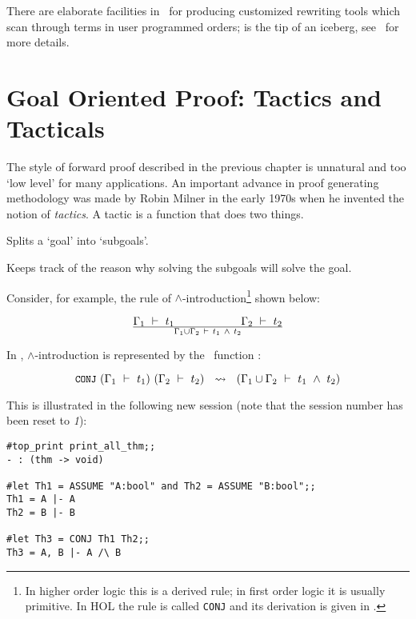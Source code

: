 There are elaborate facilities in \HOL\ for producing customized rewriting tools
which scan through terms in user programmed orders;  is the tip
of an iceberg, see \DESCRIPTION\ for more details.




\chapter{Goal Oriented Proof: Tactics and Tacticals}
\label{backward}\label{tactics}

The style of forward proof described in the previous chapter is unnatural and
too `low level' for many applications. An important advance in proof generating
methodology was made by Robin Milner in the early 1970s when he invented the
notion of {\it tactics\/}. A tactic is a function that does two things.
\begin{myenumerate}
\item Splits a `goal' into `subgoals'.
\item Keeps track of the reason why solving the subgoals will solve the goal.
\end{myenumerate}

\noindent Consider, for example, the  rule of $\wedge$-introduction\footnote{In
higher order logic this is a derived rule; in first  order logic  it is usually
primitive.  In HOL the rule is called {\tt CONJ} and its derivation is given in
\DESCRIPTION.}  shown below:

\[ \Gamma_1\ \vdash\ 
t_1\qquad\qquad\qquad\Gamma_2\ \vdash\  t_2\over \Gamma_1\cup\Gamma_2 \ \vdash\  t_1\ \wedge\ 
t_2 \]


\noindent In \HOL,  $\wedge$-introduction is  represented by  the \ML\ function
:

\[\ml{CONJ}\ (\Gamma_1\turn t_1)\ (\Gamma_2\turn t_2) \ \ \leadsto\
\ (\Gamma_1\cup\Gamma_2\turn  t_1\conj  t_2)\]

\noindent  This  is   illustrated  in  the
following new  session  (note  that  the  session  number  has  been  reset  to
{\small\sl 1}):

\setcounter{sessioncount}{1}
\begin{session}\begin{verbatim}
#top_print print_all_thm;;
- : (thm -> void)

#let Th1 = ASSUME "A:bool" and Th2 = ASSUME "B:bool";;
Th1 = A |- A
Th2 = B |- B

#let Th3 = CONJ Th1 Th2;;
Th3 = A, B |- A /\ B
\end{verbatim}\end{session}

